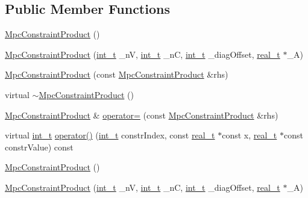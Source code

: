 \subsection*{Public Member Functions}
\begin{DoxyCompactItemize}
\item 
\hyperlink{class_mpc_constraint_product_adeb1dbc8de261b2b3fd00d3742c122f4}{Mpc\+Constraint\+Product} ()
\item 
\hyperlink{class_mpc_constraint_product_a366a0dcfff771845e4433c311a7e0ce0}{Mpc\+Constraint\+Product} (\hyperlink{_types_8hpp_ab6fd6105e64ed14a0c9281326f05e623}{int\+\_\+t} \+\_\+nV, \hyperlink{_types_8hpp_ab6fd6105e64ed14a0c9281326f05e623}{int\+\_\+t} \+\_\+nC, \hyperlink{_types_8hpp_ab6fd6105e64ed14a0c9281326f05e623}{int\+\_\+t} \+\_\+diag\+Offset, \hyperlink{qp_o_a_s_e_s__wrapper_8h_a0d00e2b3dfadee81331bbb39068570c4}{real\+\_\+t} $\ast$\+\_\+A)
\item 
\hyperlink{class_mpc_constraint_product_a8aa8f5b5c8945ef44399fa26f532883a}{Mpc\+Constraint\+Product} (const \hyperlink{class_mpc_constraint_product}{Mpc\+Constraint\+Product} \&rhs)
\item 
virtual \hyperlink{class_mpc_constraint_product_a39284cc529040c7d08638753206fc215}{$\sim$\+Mpc\+Constraint\+Product} ()
\item 
\hyperlink{class_mpc_constraint_product}{Mpc\+Constraint\+Product} \& \hyperlink{class_mpc_constraint_product_a9308d0ae70e3a791f9efcff0405f74e4}{operator=} (const \hyperlink{class_mpc_constraint_product}{Mpc\+Constraint\+Product} \&rhs)
\item 
virtual \hyperlink{_types_8hpp_ab6fd6105e64ed14a0c9281326f05e623}{int\+\_\+t} \hyperlink{class_mpc_constraint_product_af18c36ba5b5cf6c1c33b03d4bf37f8dc}{operator()} (\hyperlink{_types_8hpp_ab6fd6105e64ed14a0c9281326f05e623}{int\+\_\+t} constr\+Index, const \hyperlink{qp_o_a_s_e_s__wrapper_8h_a0d00e2b3dfadee81331bbb39068570c4}{real\+\_\+t} $\ast$const x, \hyperlink{qp_o_a_s_e_s__wrapper_8h_a0d00e2b3dfadee81331bbb39068570c4}{real\+\_\+t} $\ast$const constr\+Value) const
\item 
\hyperlink{class_mpc_constraint_product_adeb1dbc8de261b2b3fd00d3742c122f4}{Mpc\+Constraint\+Product} ()
\item 
\hyperlink{class_mpc_constraint_product_a366a0dcfff771845e4433c311a7e0ce0}{Mpc\+Constraint\+Product} (\hyperlink{_types_8hpp_ab6fd6105e64ed14a0c9281326f05e623}{int\+\_\+t} \+\_\+nV, \hyperlink{_types_8hpp_ab6fd6105e64ed14a0c9281326f05e623}{int\+\_\+t} \+\_\+nC, \hyperlink{_types_8hpp_ab6fd6105e64ed14a0c9281326f05e623}{int\+\_\+t} \+\_\+diag\+Offset, \hyperlink{qp_o_a_s_e_s__wrapper_8h_a0d00e2b3dfadee81331bbb39068570c4}{real\+\_\+t} $\ast$\+\_\+A)

\end{DoxyCompactItemize}
